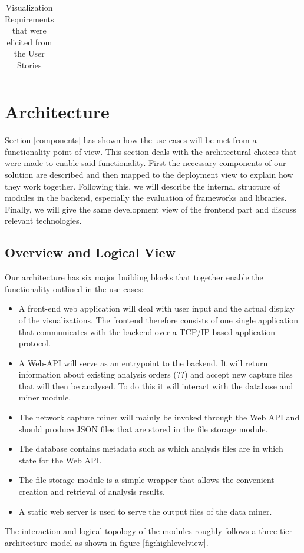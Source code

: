\begin{table}[]
\begin{tabular}{|p{1.1cm}|p{12cm}|}
\end{tabular}
\caption{Visualization Requirements that were elicited from the User Stories}
\label{table:2}
\end{table}
\fi
\section{Architecture}
Section \ref{components} has shown how the use cases will be met from a functionality point of view. This section deals with the architectural choices that were made to enable said functionality. First the necessary components of our solution are described and then mapped to the deployment view to explain how they work together. Following this, we will describe the internal structure of modules in the backend, especially the evaluation of frameworks and libraries. Finally, we will give the same development view of the frontend part and discuss relevant technologies.

\subsection{Overview and Logical View}
Our architecture has six major building blocks that together enable the functionality outlined in the use cases:
\begin{itemize}
    \item A front-end web application will deal with user input and the actual display of the visualizations. The frontend therefore consists of one single application that communicates with the backend over a TCP/IP-based application protocol.
    \item A Web-API will serve as an entrypoint to the backend. It will return information about existing analysis orders (??) and accept new capture files that will then be analysed. To do this it will interact with the database and miner module.
    \item The network capture miner will mainly be invoked through the Web API and should produce JSON files that are stored in the file storage module.
    \item The database contains metadata such as which analysis files are in which state for the Web API.
    \item The file storage module is a simple wrapper that allows the convenient creation and retrieval of analysis results.
    \item A static web server is used to serve the output files of the data miner.
    
\end{itemize}{}
The interaction and logical topology of the modules roughly follows a three-tier architecture model as shown in figure \ref{fig:highlevelview}.

